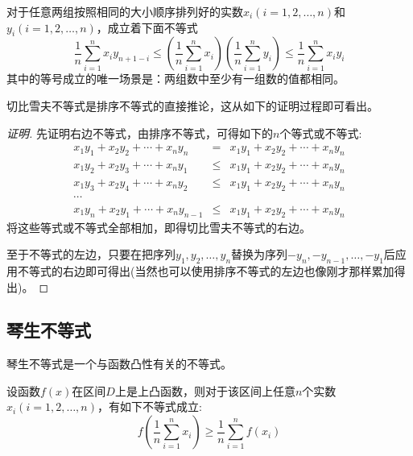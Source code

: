 \begin{theorem}[切比雪夫不等式]
对于任意两组按照相同的大小顺序排列好的实数$x_i(i=1,2,\ldots,n)$和$y_i(i=1,2,\ldots,n)$，成立着下面不等式
\begin{equation}
  \label{eq:chebyshev-inequation}
  \frac{1}{n}\sum_{i=1}^nx_iy_{n+1-i}
  \leqslant \left( \frac{1}{n}\sum_{i=1}^nx_i \right) \left( \frac{1}{n}\sum_{i=1}^ny_i \right)
  \leqslant \frac{1}{n}\sum_{i=1}^nx_iy_i
\end{equation}
其中的等号成立的唯一场景是：两组数中至少有一组数的值都相同。
\end{theorem}

切比雪夫不等式是排序不等式的直接推论，这从如下的证明过程即可看出。

\begin{proof}[证明]
  先证明右边不等式，由排序不等式，可得如下的$n$个等式或不等式:
  \begin{eqnarray*}
    x_1y_1+x_2y_2+\cdots+x_ny_n &=& x_1y_1+x_2y_2+\cdots+x_ny_n \\
    x_1y_2+x_2y_3+\cdots+x_ny_1 & \leqslant & x_1y_1+x_2y_2+\cdots+x_ny_n \\
    x_1y_3+x_2y_4+\cdots+x_ny_2 & \leqslant & x_1y_1+x_2y_2+\cdots+x_ny_n \\
    \cdots & & \\
    x_1y_n+x_2y_1+\cdots+x_ny_{n-1} & \leqslant & x_1y_1+x_2y_2+\cdots+x_ny_n 
  \end{eqnarray*}
  将这些等式或不等式全部相加，即得切比雪夫不等式的右边。

  至于不等式的左边，只要在把序列$y_1,y_2,\ldots,y_n$替换为序列$-y_n,-y_{n-1},\ldots,-y_1$后应用不等式的右边即可得出(当然也可以使用排序不等式的左边也像刚才那样累加得出)。
\end{proof}

\subsection{琴生不等式}
\label{sec:jenson-inequality}

琴生不等式是一个与函数凸性有关的不等式。
\begin{theorem}[琴生不等式]
  设函数$f(x)$在区间$D$上是上凸函数，则对于该区间上任意$n$个实数$x_i(i=1,2,\ldots,n)$，有如下不等式成立:
  \begin{equation}
    \label{eq:jenson-inequality-some-import-inequality}
    f \left( \frac{1}{n} \sum_{i=1}^nx_i \right) \geqslant
    \frac{1}{n} \sum_{i=1}^n f(x_i)
  \end{equation}
\end{theorem}

